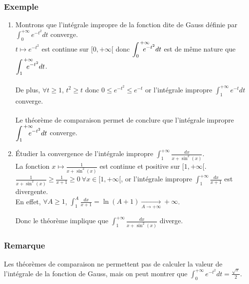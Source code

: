 \documentclass[a4paper,10pt]{book} %
\newcommand{\displayAmath}{\displaystyle}
\begin{document}
\subsubsection{Exemple}
\begin{enumerate}
\item Montrons que l'intégrale impropre de la fonction dite de Gauss définie par $\displayAmath \int_0^{+\infty}e^{-t^2}dt$ converge.\\
$t\mapsto e^{-t^2}$ est continue sur $[0,+\infty[$ donc $\displayAmath \int_0^{\mathclap{~~~~~+\infty}}~e^{-t^2}dt$ est de même nature que $\displayAmath \int_1^{\mathclap{~~~~~+\infty}}~e^{-t^2}dt$.\\\\
De plus, $\forall t\geq 1$, $t^2\geq t$ donc $0\leq e^{-t^2}\leq e^{-t}$ or l'intégrale impropre $\displayAmath \int_1^{+\infty}e^{-t}dt$ converge.\\\\
Le théorème de comparaison permet de conclure que l'intégrale impropre $\displayAmath \int_{1}^{\mathclap{~~~~~+\infty}}~~e^{-t^2}dt$ converge.

\item 
Étudier la convergence de l'intégrale impropre $\displayAmath \int_1^{+\infty}\frac{dx}{x+\sin^2(x)}$.\\

La fonction $x\mapsto \frac{1}{x+\sin^2(x)}$ est continue et positive sur $[1,+\infty[$.\\
$\displayAmath\frac{1}{x+\sin^2(x)}\geq \frac{1}{x+1}\geq 0 ~\forall x\in [1,+\infty[$, or l'intégrale impropre $\displayAmath \int_1^{+\infty}\frac{dx}{x+1}$ est divergente.\\

En effet, $\forall A\geq 1$, $\displayAmath \int_1^A\frac{dx}{x+1}=\ln(A+1)\underset{A\rightarrow +\infty}{\rightarrow} +\infty$.

Donc le théorème implique que $\displayAmath \int_1^{+\infty}\frac{dx}{x+\sin^2(x)}$ diverge.
\end{enumerate}

\subsubsection{Remarque}
Les théorèmes de comparaison ne permettent pas de calculer la valeur de l'intégrale de la fonction de Gauss, mais on peut montrer que $\displayAmath \int_0^{+\infty}e^{-t^2}dt=\frac{\sqrt{\pi}}{2}$.

\newpage
\end{document}
